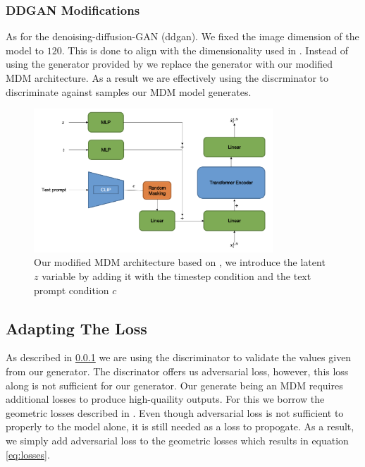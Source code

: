 \documentclass[10pt,twocolumn,letterpaper]{article}
\begin{document}
\subsubsection{DDGAN Modifications}\label{sec:ddgan-mod}

As for the denoising-diffusion-GAN (ddgan). We fixed the image dimension of the model to $120$. This is done to align with the dimensionality used in \cite{Guo_2022_CVPR}. Instead of using the generator provided by \cite{Xiao22} we replace the generator with our modified MDM architecture. As a result we are effectively using the discrminator to discriminate against samples our MDM model generates. \par 

\begin{figure}[h!t]
	\centering
	\includegraphics[width=0.8\textwidth]{imgs/modified-MDM.png}
	\caption{Our modified MDM architecture based on \cite{Tevet23}, we introduce the latent $z$ variable by adding it with the timestep condition and the text prompt condition $c$}
	\label{fig:modified-mdm]}
\end{figure}

\subsection{Adapting The Loss}

As described in \ref{sec:ddgan-mod} we are using the discriminator to validate the values given from our generator. The discrinator offers us adversarial loss, however, this loss along is not sufficient for our generator. Our generate being an MDM requires additional losses to produce high-quaility outputs. For this we borrow the geometric losses described in \cite{Tevet23}. Even though adversarial loss is not sufficient to properly to the model alone, it is still needed as a loss to propogate. As a result, we simply add adversarial loss to the geometric losses which results in equation \ref{eq:losses}.
\end{document}
